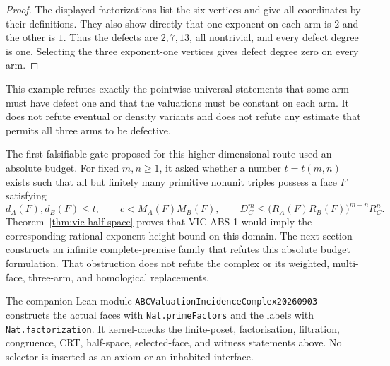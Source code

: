 \begin{proof}
The displayed factorizations list the six vertices and give all coordinates
by their definitions.  They also show directly that one exponent on each arm
is $2$ and the other is $1$.  Thus the defects are $2,7,13$, all nontrivial,
and every defect degree is one.  Selecting the three exponent-one vertices
gives defect degree zero on every arm.
\end{proof}

This example refutes exactly the pointwise universal statements that some arm
must have defect one and that the valuations must be constant on each arm.  It
does not refute eventual or density variants and does not refute any estimate
that permits all three arms to be defective.

The first falsifiable gate proposed for this higher-dimensional route used an
absolute budget.  For fixed $m,n\ge1$, it asked whether a number
$t=t(m,n)$ exists such that all but finitely many primitive nonunit triples
possess a face $F$ satisfying
\[
 d_A(F),d_B(F)\le t,\qquad
 c<M_A(F)M_B(F),\qquad
 D_C^m\le\bigl(R_A(F)R_B(F)\bigr)^{m+n}R_C^n.
\tag{VIC-ABS-1}
\]
Theorem~\ref{thm:vic-half-space} proves that VIC-ABS-1 would imply the
corresponding rational-exponent height bound on this domain.  The next section
constructs an infinite complete-premise family that refutes this absolute
budget formulation.  That obstruction does not refute the complex or its
weighted, multi-face, three-arm, and homological replacements.

The companion Lean module
\texttt{ABCValuationIncidenceComplex20260903} constructs the actual faces with
\texttt{Nat.primeFactors} and the labels with \texttt{Nat.factorization}.  It
kernel-checks the finite-poset, factorisation, filtration, congruence, CRT,
half-space, selected-face, and witness statements above.  No selector is
inserted as an axiom or an inhabited interface.
